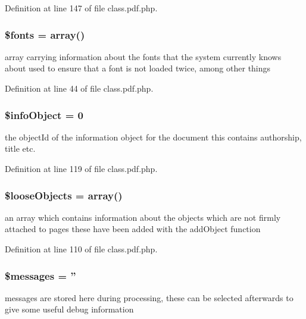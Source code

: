 \-Definition at line 147 of file class.\-pdf.\-php.

\hypertarget{class_cpdf_ac330cfe6dbddd6c5d814439f97fbaf69}{
\subsubsection[{\$fonts}]{\setlength{\rightskip}{0pt plus 5cm}\$fonts = array()}}\label{class_cpdf_ac330cfe6dbddd6c5d814439f97fbaf69}
array carrying information about the fonts that the system currently knows about used to ensure that a font is not loaded twice, among other things 

\-Definition at line 44 of file class.\-pdf.\-php.

\hypertarget{class_cpdf_ae60fb73fb55ea5cf46351c519f2e16fd}{
\subsubsection[{\$info\-Object}]{\setlength{\rightskip}{0pt plus 5cm}\$info\-Object = 0}}\label{class_cpdf_ae60fb73fb55ea5cf46351c519f2e16fd}
the object\-Id of the information object for the document this contains authorship, title etc. 

\-Definition at line 119 of file class.\-pdf.\-php.

\hypertarget{class_cpdf_aedb3e9d19ff1ebfaa5added699a9671d}{
\subsubsection[{\$loose\-Objects}]{\setlength{\rightskip}{0pt plus 5cm}\$loose\-Objects = array()}}\label{class_cpdf_aedb3e9d19ff1ebfaa5added699a9671d}
an array which contains information about the objects which are not firmly attached to pages these have been added with the add\-Object function 

\-Definition at line 110 of file class.\-pdf.\-php.

\hypertarget{class_cpdf_a21a183f927a6d243fe6b4ba3a6c4d4c8}{
\subsubsection[{\$messages}]{\setlength{\rightskip}{0pt plus 5cm}\$messages = ''}}\label{class_cpdf_a21a183f927a6d243fe6b4ba3a6c4d4c8}
messages are stored here during processing, these can be selected afterwards to give some useful debug information 

